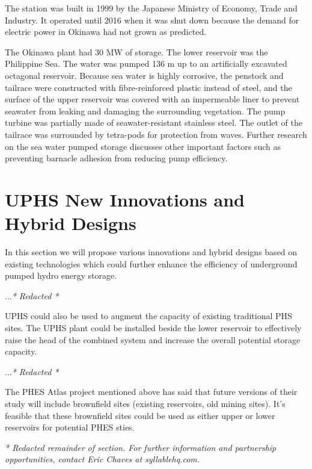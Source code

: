 \documentclass[hidelinks,12pt,a4paper]{article}
\begin{document}
The station was built in 1999 by the Japanese Ministry of Economy, Trade and Industry. It operated until 2016 when it was shut down because the demand for electric power in Okinawa had not grown as predicted. \cite{ExperimentalPowerPlantInKunigamiDismantled}

The Okinawa plant had 30 MW of storage. The lower reservoir was the Philippine Sea. The water was pumped 136 m up to an artificially excavated octagonal reservoir. Because sea water is highly corrosive, the
penstock and tailrace were constructed with fibre-reinforced plastic instead of steel, and the surface of the upper reservoir was covered with an impermeable liner to prevent seawater from leaking and damaging the surrounding vegetation. The pump turbine was partially made of seawater-resistant stainless steel. \cite{SeaWaterPumpedStoragePowerPlant} The outlet of the tailrace was  surrounded by tetra-pods for protection from waves. \cite{DevelopmentOfPumpTurbineForSeawaterPumpedStorage} Further research on the sea water pumped storage discusses other important factors such as preventing barnacle adhesion from reducing pump efficiency. \cite{DevelopmentOfPumpTurbineForSeawaterPumpedStorage}


\pagebreak[1]
\section{UPHS New Innovations and Hybrid Designs}
In this section we will propose various innovations and hybrid designs based on existing technologies which could further enhance the efficiency of underground pumped hydro energy storage.

...\textit{* Redacted *}

UPHS could also be used to augment the capacity of existing traditional PHS sites. The UPHS plant could be installed beside the lower reservoir to effectively raise the head of the combined system and increase the overall potential storage capacity.

...\textit{* Redacted *}

The PHES Atlas project mentioned above has said that future versions of their study will include brownfield sites (existing reservoirs, old mining sites). It's feasible that these brownfield sites could be used as either upper or lower reservoirs for potential PHES sties.

\textit{* Redacted remainder of section. For further information and partnership opportunities, contact Eric Chaves at syllablehq.com.}
\end{document}
